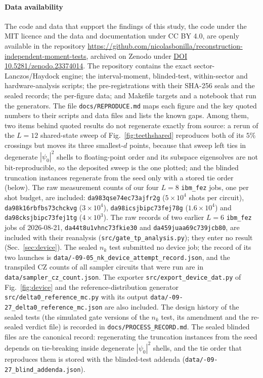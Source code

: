\documentclass[submission, PhysCore]{SciPost}
\begin{document}
\paragraph{Data availability}
The code and data that support the findings of this study, the code under the MIT licence and the data and documentation under CC BY 4.0, are openly available in the repository \url{https://github.com/nicolasbonilla/reconstruction-independent-moment-tests}, archived on Zenodo under \href{https://doi.org/10.5281/zenodo.23374014}{DOI 10.5281/zenodo.23374014}. The repository contains the exact sector-Lanczos/Haydock engine; the interval-moment, blinded-test, within-sector and hardware-analysis scripts; the pre-registrations with their SHA-256 seals and the sealed records; the per-figure data; and Makefile targets and a notebook that run the generators. The file \texttt{docs/\allowbreak REPRODUCE.md} maps each figure and the key quoted numbers to their scripts and data files and lists the known gaps. Among them, two items behind quoted results do not regenerate exactly from source: a rerun of the $L=12$ shared-state sweep of Fig.~\ref{fig:teethshared} reproduces both of its $5\%$ crossings but moves its three smallest-$d$ points, because that sweep left ties in degenerate $|\psi_0|^2$ shells to floating-point order and its subspace eigensolves are not bit-reproducible, so the deposited sweep is the one plotted; and the blinded truncation instances regenerate from the seed only with a stored tie order (below). The raw measurement counts of our four $L=8$ \texttt{ibm\_fez} jobs, one per shot budget, are included: \texttt{da983qse74ec73ajfr2g} ($5\times10^4$ shots per circuit), \texttt{da98k16rbfbs73chckvg} ($3\times10^4$), \texttt{da98icsjbipc73fej78g} ($1.6\times10^4$) and \texttt{da98cksjbipc73fej1tg} ($4\times10^3$). The raw records of two earlier $L=6$ \texttt{ibm\_fez} jobs of 2026-08-21, \texttt{da44t8u1vhnc73fkie30} and \texttt{da459juaa69c739jcb80}, are included with their reanalysis (\texttt{src/\allowbreak gate\_tp\_analysis.py}); they enter no result (Sec.~\ref{sec:device}). The sealed $n_k$ test submitted no device job; the record of its two launches is \texttt{data/-09-05\_nk\_device\_\allowbreak attempt\_record.json}, and the transpiled CZ counts of all sampler circuits that were run are in \texttt{data/\allowbreak sampler\_cz\_count.json}. The exporter \texttt{src/\allowbreak export\_device\_dat.py} of Fig.~\ref{fig:device} and the reference-distribution generator \texttt{src/\allowbreak delta0\_reference\_mc.py} with its output \texttt{data/-09-27\_delta0\_\allowbreak reference\_mc.json} are also included. The design history of the sealed tests (the simulated gate versions of the $n_k$ test, its amendment and the re-sealed verdict file) is recorded in \texttt{docs/\allowbreak PROCESS\_RECORD.md}. The sealed blinded files are the canonical record: regenerating the truncation instances from the seed depends on tie-breaking inside degenerate $|\psi_0|^2$ shells, and the tie order that reproduces them is stored with the blinded-test addenda (\texttt{data/-09-27\_blind\_addenda.json}).
\end{document}
